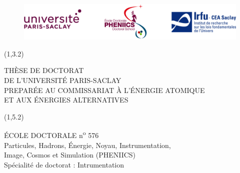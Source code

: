 
\tikzset{external/export=false}	
\begin{titlepage}
	\thispagestyle{empty}
	
	
	\begin{figure}
		\vspace{-2cm}
		\hspace{0.5cm}
		\includegraphics[width=14cm]{00_Guards/Logos/Logo_ALL3.png}\\
		\vspace{1cm}
	\end{figure}
	
	\begin{textblock}{14}(1,3.2)
		\begin{center}
			\textcolor{blue!20!red!45!black!75!}
			{\uppercase{\Large Thèse de Doctorat \\ de L'Université Paris-Saclay \\ Preparée au Commissariat à l'Énergie atomique\\ et aux Énergies alternatives}}
		\end{center}
	\end{textblock}
	
	\begin{textblock}{14}(1,5.2)
		\begin{center}
			\normalsize
			\uppercase{école doctorale}	 n\textsuperscript{o} 576 \\
			Particules, Hadrons, \'{E}nergie, Noyau, Instrumentation, \\Image, Cosmos et Simulation (PHENIICS)\\
			Spécialité de doctorat : Intrumentation
		\end{center}
	\end{textblock}
	

\end{titlepage}
